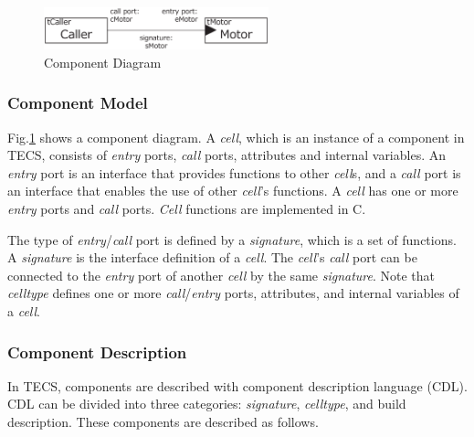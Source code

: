\documentclass[conference]{IEEEtran/IEEEtran}
\begin{document}
\begin{figure}[t]
    \centering
    \includegraphics[width=6.5cm,clip]{figure/component_diagram.eps}
    \caption{Component Diagram}
    \label{fig:component}
\end{figure}

\subsubsection{Component Model}

Fig.\ref{fig:component} shows a component diagram.
A {\it cell}, which is an instance of a component in TECS, consists of {\it entry} ports, {\it call} ports, attributes and internal variables.
An {\it entry} port is an interface that provides functions to other {\it cell}s, and a {\it call} port is an interface that enables the use of other {\it cell}'s functions.
A {\it cell} has one or more {\it entry} ports and {\it call} ports.
{\it Cell} functions are implemented in C.

The type of {\it entry}/{\it call} port is defined by a {\it signature}, which is a set of functions.
A {\it signature} is the interface definition of a {\it cell}.
The {\it cell}'s  {\it call} port can be connected to the {\it entry} port of another {\it cell} by the same {\it signature}.
Note that {\it celltype} defines one or more {\it call}/{\it entry} ports, attributes, and internal variables of a {\it cell}.


\subsubsection{Component Description}

In TECS, components are described with component description language (CDL).
CDL can be divided into three categories: {\it signature}, {\it celltype}, and build description.
These components are described as follows.
\end{document}
